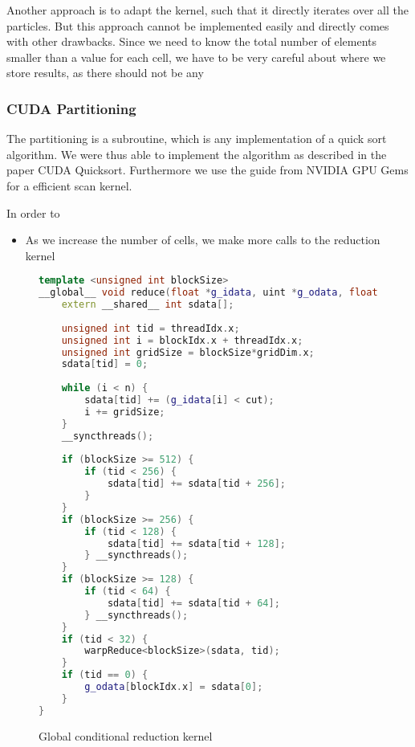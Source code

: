 \documentclass[]{article}
\begin{document}
Another approach is to adapt the kernel, such that it directly iterates over all the particles. But this approach cannot be implemented easily and directly comes with other drawbacks. Since we need to know the total number of elements smaller than a value for each cell, we have to be very careful about where we store results, as there should not be any 

\subsubsection{CUDA Partitioning}

The partitioning is a subroutine, which is any implementation of a quick sort algorithm. We were thus able to implement the algorithm as described in the paper CUDA Quicksort. Furthermore we use the guide from NVIDIA GPU Gems for a efficient scan kernel. 

In order to 


\begin{itemize}
	\item As we increase the number of cells, we make more calls to the reduction kernel 
	
\end{itemize}

\begin{figure}[H]
	
	\begin{lstlisting}[language=c++]
template <unsigned int blockSize>
__global__ void reduce(float *g_idata, uint *g_odata, float cut, int n) {
	extern __shared__ int sdata[];
	
	unsigned int tid = threadIdx.x;
	unsigned int i = blockIdx.x + threadIdx.x;
	unsigned int gridSize = blockSize*gridDim.x;
	sdata[tid] = 0;
	
	while (i < n) {
		sdata[tid] += (g_idata[i] < cut);
		i += gridSize;
	}
	__syncthreads();
	
   	if (blockSize >= 512) {
		if (tid < 256) {
			sdata[tid] += sdata[tid + 256];
		}
	}
	if (blockSize >= 256) {
		if (tid < 128) {
			sdata[tid] += sdata[tid + 128];
		} __syncthreads();
	}
	if (blockSize >= 128) {
		if (tid < 64) {
			sdata[tid] += sdata[tid + 64];
		} __syncthreads();
	}
	if (tid < 32) {
		warpReduce<blockSize>(sdata, tid);
	}
	if (tid == 0) {
		g_odata[blockIdx.x] = sdata[0];
	}
}
	\end{lstlisting}
	\caption{Global conditional reduction kernel}
	\label{cuda:reduction}
\end{figure}
\end{document}
